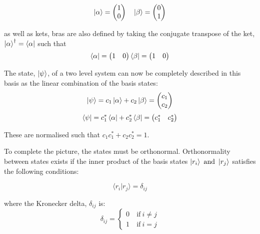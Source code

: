 \begin{equation}
  \ket{\alpha} = \begin{pmatrix}
    1\\
    0
\end{pmatrix}\quad
 \ket{\beta} = \begin{pmatrix}
   0\\
   1
\end{pmatrix}
\end{equation}

as well as kets, bras are also defined by taking the conjugate transpose of the ket, $\ket{\alpha}^{\dagger} =
\bra{\alpha}$ such that
\begin{equation}
  \bra{\alpha} = \begin{pmatrix}
    1 & 0
\end{pmatrix}
  \bra{\beta} = \begin{pmatrix}
  1 & 0
\end{pmatrix}
\end{equation}

The state, $\ket{\psi}$, of a two level system can now be completely described in this basis
as the linear combination of the basis states:
\begin{equation}\label{eqn:zeeman}
  \ket{\psi} = c_1\ket{\alpha} + c_2\ket{\beta} = \begin{pmatrix}
    c_1\\
    c_2
\end{pmatrix}
\end{equation}
\begin{equation}
  \bra{\psi} = c_1^*\bra{\alpha} + c_2^*\bra{\beta} = \begin{pmatrix}
    c_1^* & c_2^*
\end{pmatrix}
\end{equation}

These are normalised such that $c_1c_1^* + c_2c_2^* = 1$.

To complete the picture, the states must be orthonormal. Orthonormality between states exists if the inner product of the basis states $\ket{r_i} ~\text{and}~ \ket{r_j}$ satisfies the following conditions:

\begin{equation}
  \langle r_i\vert r_j\rangle = \delta_{ij}
\end{equation}

where the Kronecker delta, $\delta_{ij}$ is:
\begin{equation}
  \delta_{ij} = \begin{cases}
    0 & ~\text{if}~ i \ne j\\
    1 & ~\text{if}~ i = j
                \end{cases}
\end{equation}

